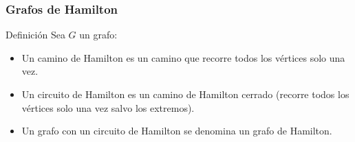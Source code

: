 \documentclass{beamer}
\begin{document}
\begin{frame}
\frametitle{Grafos de Hamilton}
\begin{block}{Definici\'on}
Sea $G$ un grafo:

\begin{itemize}
\item Un camino de Hamilton es un camino que recorre todos los v\'ertices solo una vez. 
\item Un circuito de Hamilton es un camino de Hamilton cerrado (recorre todos los v\'ertices solo una vez salvo los extremos). 
\item Un grafo con un circuito de Hamilton se denomina un grafo de Hamilton. 
\end{itemize}
\end{block}
\end{frame}



\end{document}
